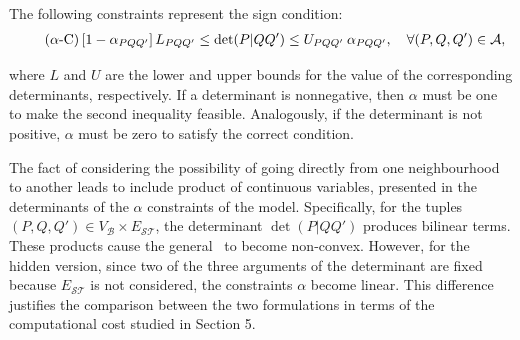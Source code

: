 \documentclass[a4paper,  review, authoryear, 1p.]{elsarticle}
\newcommand{\KMPN}{{\sf{H-KMPN}\xspace }}
\newcommand{\VB}{{V^{}_{\mathcal B}}}
\newcommand{\CV}[1]{{\color{blue}#1}}
\newcommand{\determinant}[3]{\det({#1|#2#3})}
\begin{document}
	The following constraints represent the sign condition:
	\begin{align*}\label{eq:alphaC} \tag{$\alpha$-C}
		\left[1-\alphamas{P}{Q}{Q'}\right]\LS{P}{Q}{Q'}\leq\determinant{P}{Q}{Q'}\leq \US{P}{Q}{Q'}\:\alphamas{P}{Q}{Q'},\quad\forall (P,Q,Q') \in \mathcal A,
	\end{align*}
	
	\noindent where $L$ and $U$ are the lower and upper bounds for the value of the corresponding determinants, respectively. If a determinant is nonnegative, then $\alpha$ must be one to make the second inequality feasible. Analogously, if the determinant is not positive, $\alpha$ must be zero to satisfy the correct condition.
	
	\newcommand{\deltamas}[4]{\delta_{#1#2#3#4}}
	
	The fact of considering the possibility of going directly from one neighbourhood  to another leads to include product of continuous variables, presented in the determinants of the $\alpha$ constraints of the model. Specifically, for the tuples $(P, Q, Q')\in V_\mathcal B\times E_{\mathcal S\mathcal T}$, the determinant $\det(P|QQ')$ produces bilinear terms. These products cause the general \KMPN \ to become non-convex. However, for the hidden version, since two of the three arguments of the determinant are fixed because $E_{\mathcal S\mathcal T}$ is not considered, the constraints $\alpha$ become linear. This difference justifies the comparison between the two formulations in terms of the computational cost studied in Section 5.
			 
\end{document}
